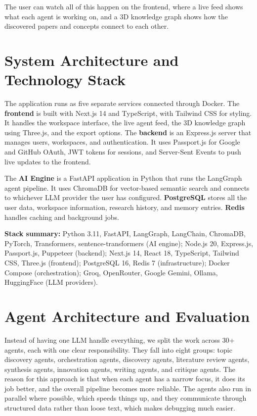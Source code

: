 \documentclass[12pt,a4paper]{article}
\begin{document}
The user can watch all of this happen on the frontend, where a live feed shows what each agent is working on, and a 3D knowledge graph shows how the discovered papers and concepts connect to each other.

\section{System Architecture and Technology Stack}

The application runs as five separate services connected through Docker. The \textbf{frontend} is built with Next.js 14 and TypeScript, with Tailwind CSS for styling. It handles the workspace interface, the live agent feed, the 3D knowledge graph using Three.js, and the export options. The \textbf{backend} is an Express.js server that manages users, workspaces, and authentication. It uses Passport.js for Google and GitHub OAuth, JWT tokens for sessions, and Server-Sent Events to push live updates to the frontend.

The \textbf{AI Engine} is a FastAPI application in Python that runs the LangGraph agent pipeline. It uses ChromaDB for vector-based semantic search and connects to whichever LLM provider the user has configured. \textbf{PostgreSQL} stores all the user data, workspace information, research history, and memory entries. \textbf{Redis} handles caching and background jobs.

\smallskip
\noindent\textbf{Stack summary:} Python 3.11, FastAPI, LangGraph, LangChain, ChromaDB, PyTorch, Transformers, sentence-transformers (AI engine); Node.js 20, Express.js, Passport.js, Puppeteer (backend); Next.js 14, React 18, TypeScript, Tailwind CSS, Three.js (frontend); PostgreSQL 16, Redis 7 (infrastructure); Docker Compose (orchestration); Groq, OpenRouter, Google Gemini, Ollama, HuggingFace (LLM providers).

\section{Agent Architecture and Evaluation}

Instead of having one LLM handle everything, we split the work across 30+ agents, each with one clear responsibility. They fall into eight groups: topic discovery agents, orchestration agents, discovery agents, literature review agents, synthesis agents, innovation agents, writing agents, and critique agents. The reason for this approach is that when each agent has a narrow focus, it does its job better, and the overall pipeline becomes more reliable. The agents also run in parallel where possible, which speeds things up, and they communicate through structured data rather than loose text, which makes debugging much easier.
\end{document}
